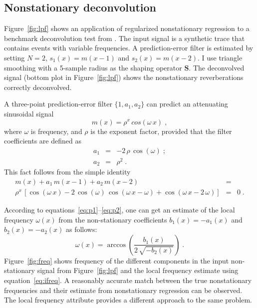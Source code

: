 \subsection{Nonstationary deconvolution}


Figure~\ref{fig:lpf} shows an application of regularized nonstationary
regression to a benchmark deconvolution test from \cite{gee}. The
input signal is a synthetic trace that contains events with variable
frequencies. A prediction-error filter is estimated by setting $N=2$,
$s_1(x)=m(x-1)$ and $s_2(x)=m(x-2)$. I use triangle smoothing with a
5-sample radius as the shaping operator $\mathbf{S}$. The deconvolved
signal (bottom plot in Figure~\ref{fig:lpf}) shows the nonstationary
reverberations correctly deconvolved.


A three-point prediction-error filter $\{1,a_1,a_2\}$ can predict an
attenuating sinusoidal signal 
\begin{equation}
\label{eq:cos}
m(x) = \rho^x\,cos(\omega\,x)\;,
\end{equation}
where $\omega$ is frequency, and $\rho$ is the exponent factor,
provided that the filter coefficients are defined as
\begin{eqnarray}
\label{eq:p1}
a_1 & = & -2\,\rho\,\cos(\omega)\;; \\
\label{eq:p2}
a_2 & = & \rho^2\;.
\end{eqnarray}
This fact follows from the simple identity
\begin{eqnarray}
\nonumber
m(x)+a_1\,m(x-1)+a_2\,m(x-2)  & = & \\ 
\rho^x\,\left[\cos(\omega\,x)-2\,\cos(\omega)\,\cos(\omega\,x-\omega)+\cos(\omega\,x-2\,\omega)\right] & = & 0\;.
\end{eqnarray}

According to equations~\ref{eq:p1}--\ref{eq:p2}, one can get an
estimate of the local frequency $\omega(x)$ from the non-stationary
coefficients $b_1(x)=-a_1(x)$ and $b_2(x)=-a_2(x)$ as follows:
\begin{equation}
\label{eq:ifreq}
\omega(x) = \arccos\left(\frac{b_1(x)}{2\,\sqrt{-b_2(x)}}\right)\;.
\end{equation}
Figure~\ref{fig:freq} shows frequency of the different components in
the input non-stationary signal from Figure~\ref{fig:lpf} and the
local frequency estimate using equation~\ref{eq:ifreq}.  A reasonably
accurate match between the true nonstationary frequencies and their
estimate from nonstationary regression can be observed.  The local
frequency attribute
\cite[]{attr} provides a different approach to the same problem.

